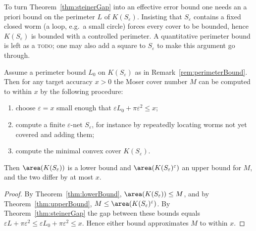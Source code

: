 \begin{remark}
    \label{rem:perimeterBound}
    To turn Theorem~\ref{thm:steinerGap} into an effective error bound one needs
    an a priori bound on the perimeter $L$ of $K(S_\varepsilon)$. Insisting that
    $S_\varepsilon$ contains a fixed closed worm (a loop, e.g.\ a small circle)
    forces every cover to be bounded, hence $K(S_\varepsilon)$ is bounded with a
    controlled perimeter. A quantitative perimeter bound is left as a
    \textsc{todo}; one may also add a square to $S_\varepsilon$ to make this
    argument go through.
\end{remark}

\begin{theorem}
    \label{thm:approxAlgorithm}
    Assume a perimeter bound $L_0$ on $K(S_\varepsilon)$ as in
    Remark~\ref{rem:perimeterBound}. Then for any target accuracy $x > 0$ the
    Moser cover number $M$ can be computed to within $x$ by the following
    procedure:
    \begin{enumerate}
        \item choose $\varepsilon = x$ small enough that
            $\varepsilon L_0 + \pi \varepsilon^2 \le x$;
        \item compute a finite $\varepsilon$-net $S_\varepsilon$, for instance
            by repeatedly locating worms not yet covered and adding them;
        \item compute the minimal convex cover $K(S_\varepsilon)$.
    \end{enumerate}
    Then $\area(K(S_\varepsilon))$ is a lower bound and
    $\area(K(S_\varepsilon)^{\varepsilon})$ an upper bound for $M$, and the two
    differ by at most $x$.
\end{theorem}
\begin{proof}
    By Theorem~\ref{thm:lowerBound}, $\area(K(S_\varepsilon)) \le M$, and by
    Theorem~\ref{thm:upperBound}, $M \le \area(K(S_\varepsilon)^{\varepsilon})$.
    By Theorem~\ref{thm:steinerGap} the gap between these bounds equals
    $\varepsilon L + \pi \varepsilon^2 \le \varepsilon L_0 + \pi \varepsilon^2
    \le x$. Hence either bound approximates $M$ to within $x$.
\end{proof}


